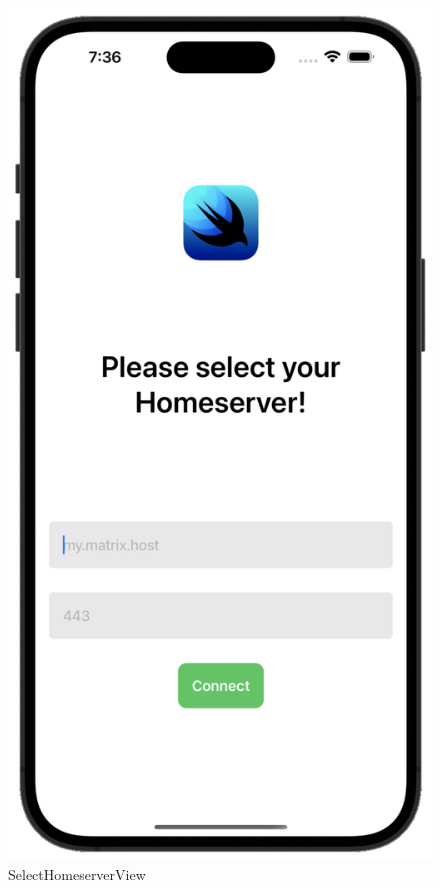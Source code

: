     \begin{figure}[h]
        \includegraphics[scale=0.5]{homeserver_white}
        \centering
        \caption{SelectHomeserverView}\label{fig:selecthomeserverview}
    \end{figure}
